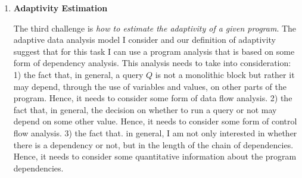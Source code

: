 \begin{enumerate}
\item 
\textbf{Adaptivity Estimation}

The third challenge is \emph{how to estimate the adaptivity of a given program}. 
The adaptive data analysis model I consider and our definition of adaptivity suggest that for this task I can use a program analysis that is based on some form of dependency analysis. This analysis needs to take into consideration:
1) the fact that, in general, a query $Q$ is not a monolithic block but rather it may depend, through the use of variables and values, on other parts of the program. 
Hence, it needs to consider some form of data flow analysis. 
2) the fact that, in general, the decision on whether to run a query or not may depend on some other value. Hence, 
 it needs to consider some form of control flow analysis.
3) the fact that. in general, I am not only interested in whether there is a dependency or not, but in the length of the chain of dependencies. 
Hence, it needs to consider some quantitative information about the program dependencies. %


\end{enumerate}
